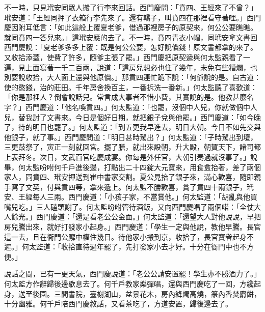 不一時，只見玳安同眾人搬了行李來回話。西門慶問：「賁四、王經來了不曾？」玳安道：「王經同押了衣箱行李先來了。還有轎子，叫賁四在那裡看守著哩。」西門慶因附耳低言：「如此這般上覆夏老爹，借過那裡房子的原契來，何公公要瞧瞧。就同賁四一答兒來。」這玳安應的去了。不一時，賁四青衣小帽，同玳安拿文書回西門慶說：「夏老爹多多上覆：既是何公公要，怎好說價錢！原文書都拿的來了。又收拾添蓋，使費了許多，隨爹主張了罷。」西門慶把原契遞與何太監親看了一遍，見上面寫著一千二百兩，說道：「這房兒想必也住了幾年，未免有些糟爛，也別要說收拾，大人面上還與他原價。」那賁四連忙跪下說：「何爺說的是。自古道：使的憨錢，治的莊田。千年房舍換百主，一番拆洗一番新。」何太監聽了喜歡道：「你是那裡人？倒會說話兒。常言成大事者不惜小費，其實說的是。他教甚麼名字？」西門慶道：「他名喚賁四。」何太監道：「也罷，沒個中人兒，你就做個中人兒，替我討了文書來。今日是個好日期，就把銀子兌與他罷。」西門慶道：「如今晚了，待的明日也罷了。」何太監道：「到五更我早進去，明日大朝。今日不如先交與他銀子，就了事。」西門慶問道：「明日甚時駕出？」何太監道：「子時駕出到壇，三更鼓祭了，寅正一刻就回宮。擺了膳，就出來設朝，升大殿，朝賀天下，諸司都上表拜冬。次日，文武百官吃慶成宴。你每是外任官，大朝引奏過就沒事了。」說畢，何太監吩咐何千戶進後邊，打點出二十四錠大元寶來，用食盒抬著，差了兩個家人，同賁四、玳安押送到崔中書家交割。夏公見抬了銀子來，滿心歡喜，隨即親手寫了文契，付與賁四等，拿來遞上。何太監不勝歡喜，賞了賁四十兩銀子，玳安、王經每人三兩。西門慶道：「小孩子家，不當賞他。」何太監道：「胡亂與他買嘴兒吃。」三人磕頭謝了。何太監吩咐管待酒飯，又向西門慶唱了兩個喏：「全仗大人餘光。」西門慶道：「還是看老公公金面。」何太監道：「還望大人對他說說，早把房兒騰出來，就好打發家小起身。」西門慶道：「學生一定與他說，教他早騰。長官這一去，且在衙門公廨中權住幾日。待他家小搬到京，收拾了，長官寶眷起身不遲。」何太監道：「收拾直待過年罷了，先打發家小去才好。十分在衙門中也不方便。」

說話之間，已有一更天氣，西門慶說道：「老公公請安置罷！學生亦不勝酒力了。」何太監方作辭歸後邊歇息去了。何千戶教家樂彈唱，還與西門慶吃了一回，方纔起身，送至後園。三間書院，臺榭湖山，盆景花木，房內絳燭高燒，篆內香焚麝餅，十分幽雅。何千戶陪西門慶敘話，又看茶吃了，方道安置，歸後邊去了。

